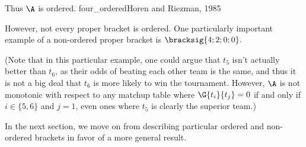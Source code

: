 {{    Thus $\A$ is ordered.
    }{four_ordered}{Horen and Riezman, 1985}

    However, not every proper bracket is ordered. One particularly important example of a non-ordered proper bracket is $\bracksig{4;2;0;0}.$


    (Note that in this particular example, one could argue that $t_5$ isn't actually better than $t_6$, as their odds of beating each other team is the same, and thus it is not a big deal that $t_6$ is more likely to win the tournament. However, $\A$ is not monotonic with respect to any matchup table where $\G{t_i}{t_j} = 0$ if and only if $i \in \{5, 6\}$ and $j = 1$, even ones where $t_5$ is clearly the superior team.)

    In the next section, we move on from describing particular ordered and non-ordered brackets in favor of a more general result.
}